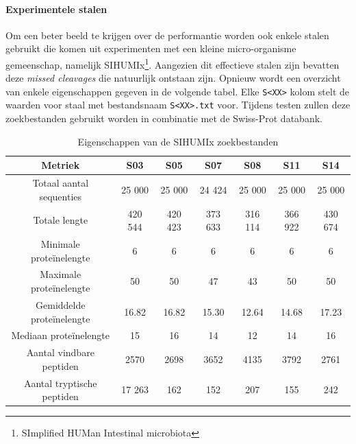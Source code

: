 \documentclass[11pt,dutch,faculty=we,layout=titlefont,underline=false,titleUppercase=true,titleUnderline=true]{ugent2016-report}
\begin{document}
    \paragraph{Experimentele stalen}
    Om een beter beeld te krijgen over de performantie worden ook enkele stalen gebruikt die komen uit experimenten met een kleine micro-organisme gemeenschap, namelijk SIHUMIx\footnote{SImplified HUMan Intestinal microbiota}\cite{SIHUMI_first_introduction, SIHUMI_frequently_used}.
    Aangezien dit effectieve stalen zijn bevatten deze \textit{missed cleavages} die natuurlijk ontstaan zijn.
    Opnieuw wordt een overzicht van enkele eigenschappen gegeven in de volgende tabel.
    Elke \texttt{S<XX>} kolom stelt de waarden voor staal met bestandsnaam \texttt{S<XX>.txt} voor.
    Tijdens testen zullen deze zoekbestanden gebruikt worden in combinatie met de Swiss-Prot databank.

    \begin{table}[h!]
        \centering
        \begin{tabular}{ c c c c c c c }
            Metriek                    & S03     & S05     & S07     & S08     & S11     & S14     \\
            \hline\hline
            Totaal aantal sequenties   & 25 000  & 25 000  & 24 424  & 25 000  & 25 000  & 25 000  \\
            Totale lengte              & 420 544 & 420 423 & 373 633 & 316 114 & 366 922 & 430 674 \\
            Minimale proteïnelengte    & 6       & 6       & 6       & 6       & 6       & 6       \\
            Maximale proteïnelengte    & 50      & 50      & 47      & 43      & 50      & 50      \\
            Gemiddelde proteïnelengte  & 16.82   & 16.82   & 15.30   & 12.64   & 14.68   & 17.23   \\
            Mediaan proteïnelengte     & 15      & 16      & 14      & 12      & 14      & 16      \\
            Aantal vindbare peptiden   & 2570    & 2698    & 3652    & 4135    & 3792    & 2761    \\
            Aantal tryptische peptiden & 17 263  & 162     & 152     & 207     & 155     & 242     \\
            \hline
        \end{tabular}
        \caption{Eigenschappen van de SIHUMIx zoekbestanden}
        \label{tab:sihumi_zoekbestanden}
    \end{table}
\end{document}
